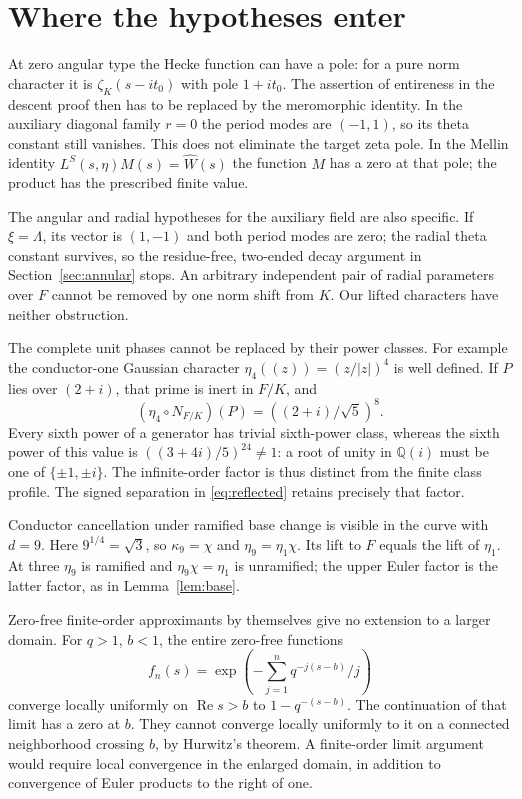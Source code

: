 \documentclass[11pt,a4paper]{article}
\numberwithin{equation}{section}
\theoremstyle{definition}
\theoremstyle{remark}
\newcommand{\Q}{\mathbb Q}
\newcommand{\Rea}{\operatorname{Re}}
\newcommand{\wt}{\widehat}
\begin{document}
\section{Where the hypotheses enter}\label{sec:limits}
At zero angular type the Hecke function can have a pole: for a pure norm character it is $\zeta_K(s-it_0)$ with pole $1+it_0$. The assertion of entireness in the descent proof then has to be replaced by the meromorphic identity. In the auxiliary diagonal family $r=0$ the period modes are $(-1,1)$, so its theta constant still vanishes. This does not eliminate the target zeta pole. In the Mellin identity $L^S(s,\eta)M(s)=\wt W(s)$ the function $M$ has a zero at that pole; the product has the prescribed finite value.

The angular and radial hypotheses for the auxiliary field are also specific. If $\xi=\Lambda$, its vector is $(1,-1)$ and both period modes are zero; the radial theta constant survives, so the residue-free, two-ended decay argument in Section~\ref{sec:annular} stops. An arbitrary independent pair of radial parameters over $F$ cannot be removed by one norm shift from $K$. Our lifted characters have neither obstruction.

The complete unit phases cannot be replaced by their power classes. For example the conductor-one Gaussian character
$\eta_4((z))=(z/|z|)^4$ is well defined. If $P$ lies over $(2+i)$, that prime is inert in $F/K$, and
\[
 (\eta_4\circ N_{F/K})(P)=((2+i)/\sqrt5)^8.
\]
Every sixth power of a generator has trivial sixth-power class, whereas the sixth power of this value is $((3+4i)/5)^{24}\ne1$: a root of unity in $\Q(i)$ must be one of $\{\pm1,\pm i\}$. The infinite-order factor is thus distinct from the finite class profile. The signed separation in \eqref{eq:reflected} retains precisely that factor.

Conductor cancellation under ramified base change is visible in the curve with $d=9$. Here $9^{1/4}=\sqrt3$, so $\kappa_9=\chi$ and $\eta_9=\eta_1\chi$. Its lift to $F$ equals the lift of $\eta_1$. At three $\eta_9$ is ramified and $\eta_9\chi=\eta_1$ is unramified; the upper Euler factor is the latter factor, as in Lemma~\ref{lem:base}.

Zero-free finite-order approximants by themselves give no extension to a larger domain. For $q>1$, $b<1$, the entire zero-free functions
\[
 f_n(s)=\exp\left(-\sum_{j=1}^n q^{-j(s-b)}/j\right)
\]
converge locally uniformly on $\Rea s>b$ to $1-q^{-(s-b)}$. The continuation of that limit has a zero at $b$. They cannot converge locally uniformly to it on a connected neighborhood crossing $b$, by Hurwitz's theorem. A finite-order limit argument would require local convergence in the enlarged domain, in addition to convergence of Euler products to the right of one.
\end{document}
